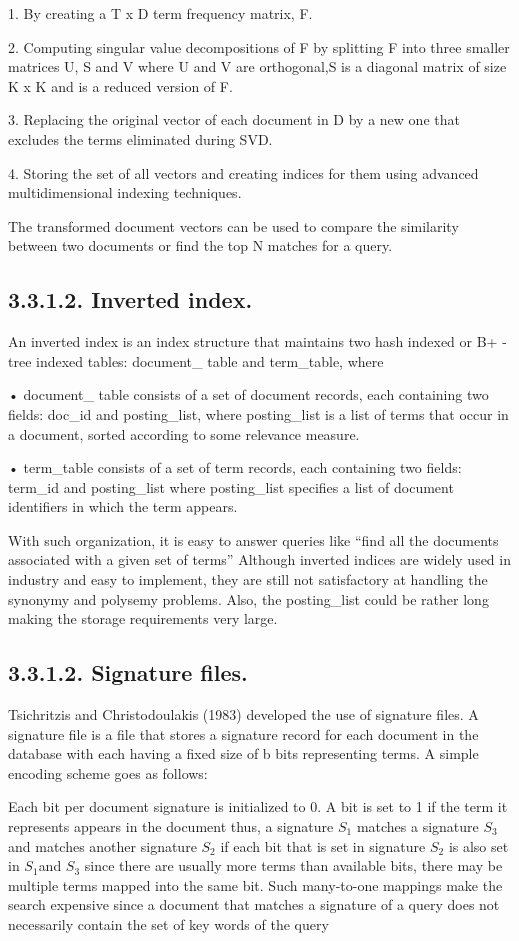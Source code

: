 \documentclass{article}
\begin{document}
1.	By creating a T x D term frequency matrix, F.

2.	Computing  singular value decompositions of F by splitting F into three smaller matrices U, S and V where U and V are orthogonal,S is a diagonal matrix of size K x K and is a reduced version of F.

3.	 Replacing the original vector of each document in D by a new one that excludes the terms eliminated during SVD. 

4.	Storing the set of all vectors and creating indices for them using advanced multidimensional indexing techniques.

The transformed document vectors can be used to compare the similarity between two documents or find the top N matches for a query. 
\subsection*{3.3.1.2. Inverted index.}
An inverted index is an index structure that maintains two hash indexed  or B+ - tree indexed tables: document\_ table and term\_table, where
 
•	document\_ table consists of a set of document records, each containing two fields: doc\_id and posting\_list, where posting\_list is a list of terms that occur in a document, sorted according to some relevance measure.

•	term\_table consists of a set of term records, each containing two fields: term\_id and posting\_list where posting\_list specifies a list of document identifiers in which the term appears.

With such organization, it is easy to answer queries like “find all the documents associated with a given set of terms” Although inverted indices are widely used in industry and easy to implement, they are still not satisfactory at handling the synonymy and polysemy problems. Also, the posting\_list  could be rather long making the storage requirements very large.

\subsection*{3.3.1.2. Signature files.}
Tsichritzis and Christodoulakis (1983) developed the use of signature files.
 A signature file is a file that stores a signature record for each document in the database with each having a fixed size of b bits representing terms. A simple encoding scheme goes as follows:
 
Each bit per document signature is initialized to 0. A bit is set to 1 if the term it represents appears in the document thus, a signature $S_{1}$ matches a signature $S_{3}$ and matches another signature $S_{2}$ if each bit that is set in signature $S_{2}$ is also set in $S_{1}$and $S_{3}$ since there are usually more terms than available bits, there may be multiple terms mapped into the same bit. Such many-to-one mappings make the search expensive since a document that matches a signature of a query does not necessarily contain the set of key words of the query 
\end{document}
